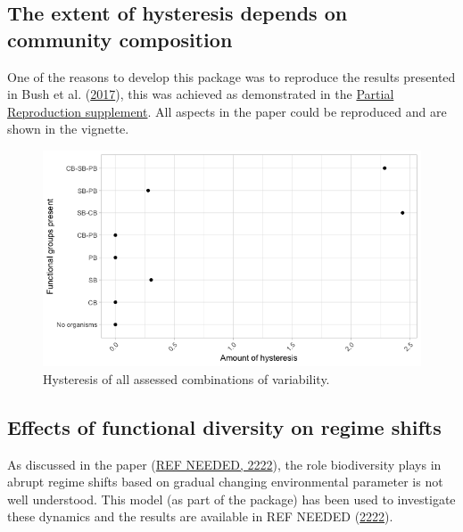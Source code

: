 \documentclass[]{elsarticle} %
\begin{document}
\hypertarget{the-extent-of-hysteresis-depends-on-community-composition}{%
\subsection{The extent of hysteresis depends on community
composition}\label{the-extent-of-hysteresis-depends-on-community-composition}}

One of the reasons to develop this package was to reproduce the results
presented in Bush et al. (\protect\hyperlink{ref-Bush2017}{2017}), this
was achieved as demonstrated in the \href{LINK_NEEDED}{Partial
Reproduction supplement}. All aspects in the paper could be reproduced
and are shown in the vignette.

\begin{figure}

{\centering \includegraphics[width=500px]{figures/user_guide_hysteresis} 

}

\caption{Hysteresis of all assessed combinations of variability.}\label{fig:user_guide_hysteresis}
\end{figure}

\hypertarget{effects-of-functional-diversity-on-regime-shifts}{%
\subsection{Effects of functional diversity on regime
shifts}\label{effects-of-functional-diversity-on-regime-shifts}}

As discussed in the paper (\protect\hyperlink{ref-REF_NEEDED}{REF
NEEDED, 2222}), the role biodiversity plays in abrupt regime shifts
based on gradual changing environmental parameter is not well
understood. This model (as part of the package) has been used to
investigate these dynamics and the results are available in REF NEEDED
(\protect\hyperlink{ref-REF_NEEDED}{2222}).
\end{document}
